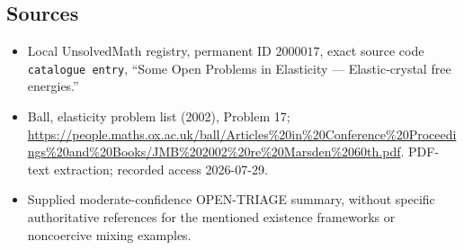 \documentclass[11pt]{article}
\begin{document}
\subsection{Sources}
\begin{itemize}
\item Local UnsolvedMath registry, permanent ID \(2000017\), exact source code \texttt{catalogue entry}, ``Some Open Problems in Elasticity --- Elastic-crystal free energies.''
\item Ball, elasticity problem list (2002), Problem 17; \url{https://people.maths.ox.ac.uk/ball/Articles%20in%20Conference%20Proceedings%20and%20Books/JMB%202002%20re%20Marsden%2060th.pdf}. PDF-text extraction; recorded access 2026-07-29.
\item Supplied moderate-confidence OPEN-TRIAGE summary, without specific authoritative references for the mentioned existence frameworks or noncoercive mixing examples.
\end{itemize}
\end{document}
